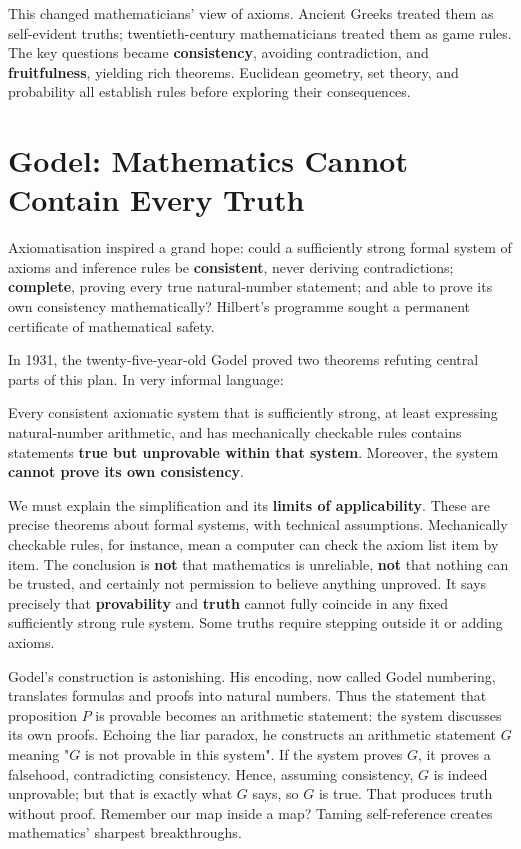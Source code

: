 This changed mathematicians' view of axioms. Ancient Greeks treated them as self-evident truths; twentieth-century mathematicians treated them as game rules. The key questions became \textbf{consistency}, avoiding contradiction, and \textbf{fruitfulness}, yielding rich theorems. Euclidean geometry, set theory, and probability all establish rules before exploring their consequences.

\section{Godel: Mathematics Cannot Contain Every Truth}

Axiomatisation inspired a grand hope: could a sufficiently strong formal system of axioms and inference rules be \textbf{consistent}, never deriving contradictions; \textbf{complete}, proving every true natural-number statement; and able to prove its own consistency mathematically? Hilbert's programme sought a permanent certificate of mathematical safety.

In 1931, the twenty-five-year-old Godel proved two theorems refuting central parts of this plan. In very informal language:

\begin{dingli}
Every consistent axiomatic system that is sufficiently strong, at least expressing natural-number arithmetic, and has mechanically checkable rules contains statements \textbf{true but unprovable within that system}. Moreover, the system \textbf{cannot prove its own consistency}.
\end{dingli}

We must explain the simplification and its \textbf{limits of applicability}. These are precise theorems about formal systems, with technical assumptions. Mechanically checkable rules, for instance, mean a computer can check the axiom list item by item. The conclusion is \textbf{not} that mathematics is unreliable, \textbf{not} that nothing can be trusted, and certainly not permission to believe anything unproved. It says precisely that \textbf{provability} and \textbf{truth} cannot fully coincide in any fixed sufficiently strong rule system. Some truths require stepping outside it or adding axioms.

Godel's construction is astonishing. His encoding, now called Godel numbering, translates formulas and proofs into natural numbers. Thus the statement that proposition $P$ is provable becomes an arithmetic statement: the system discusses its own proofs. Echoing the liar paradox, he constructs an arithmetic statement $G$ meaning "$G$ is not provable in this system". If the system proves $G$, it proves a falsehood, contradicting consistency. Hence, assuming consistency, $G$ is indeed unprovable; but that is exactly what $G$ says, so $G$ is true. That produces truth without proof. Remember our map inside a map? Taming self-reference creates mathematics' sharpest breakthroughs.

